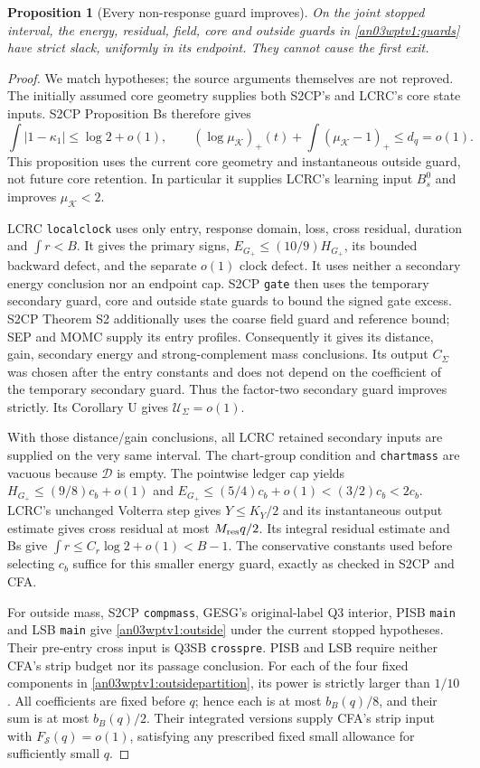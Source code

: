 \documentclass[11pt]{article}
\newtheorem{proposition}[theorem]{Proposition}
\theoremstyle{remark}\newtheorem{remark}[theorem]{Remark}
\newcommand{\KK}{\mathcal K}
\newcommand{\Gp}{G_+}
\begin{document}
\begin{proposition}[Every non-response guard improves]
\label{an03wptv1:improvements}
On the joint stopped interval, the energy, residual, field, core
and outside guards in \eqref{an03wptv1:guards} have strict slack,
uniformly in its endpoint. They cannot cause the first exit.
\end{proposition}
\begin{proof}
We match hypotheses; the source arguments themselves are not
reproved. The initially assumed core geometry supplies both
S2CP's and LCRC's core state inputs. S2CP Proposition Bs therefore
gives
\[
 \int|1-\kappa_1|\le\log2+o(1),\qquad
 (\log\mu_{\KK})_+(t)+\int(\mu_{\KK}-1)_+\le d_q=o(1).
\]
This proposition uses the current core geometry and instantaneous
outside guard, not future core retention. In particular it supplies
LCRC's learning input $B_s^0$ and improves $\mu_{\KK}<2$.

LCRC \texttt{localclock} uses only entry, response domain, loss,
cross residual, duration and $\int r<B$. It gives the primary
signs, $E_{\Gp}\le(10/9)H_{\Gp}$, its bounded backward defect,
and the separate $o(1)$ clock defect. It uses neither a secondary
energy conclusion nor an endpoint cap. S2CP \texttt{gate} then
uses the temporary secondary guard, core and outside state guards
to bound the signed gate excess. S2CP Theorem S2 additionally
uses the coarse field guard and reference bound; SEP and MOMC
supply its entry profiles. Consequently it gives its distance,
gain, secondary energy and strong-complement mass conclusions.
Its output $C_\Sigma$ was chosen after the entry constants and
does not depend on the coefficient of the temporary secondary
guard. Thus the factor-two secondary guard improves strictly.
Its Corollary U gives $\mathcal U_\Sigma=o(1)$.

With those distance/gain conclusions, all LCRC retained secondary
inputs are supplied on the very same interval. The chart-group
condition and \texttt{chartmass} are vacuous because $\mathcal D$
is empty. The pointwise ledger cap yields
$H_{\Gp}\le(9/8)c_b+o(1)$ and
$E_{\Gp}\le(5/4)c_b+o(1)<(3/2)c_b<2c_b$.
LCRC's unchanged Volterra step gives $Y\le K_Y/2$ and its
instantaneous output estimate gives cross residual at most
$M_{\rm res}q/2$. Its integral residual estimate and Bs give
$\int r\le C_r\log2+o(1)<B-1$.
The conservative constants used before selecting $c_b$ suffice
for this smaller energy guard, exactly as checked in S2CP and CFA.

For outside mass, S2CP \texttt{compmass}, GESG's original-label
Q3 interior, PISB \texttt{main} and LSB \texttt{main} give
\eqref{an03wptv1:outside} under the current stopped hypotheses.
Their pre-entry cross input is Q3SB \texttt{crosspre}.
PISB and LSB require neither CFA's strip budget nor its passage
conclusion. For each of the four fixed components in
\eqref{an03wptv1:outsidepartition}, its power is strictly larger
than $1/10$. All coefficients are fixed before $q$; hence each
is at most $b_B(q)/8$, and their sum is at most $b_B(q)/2$.
Their integrated versions supply CFA's strip input with
$F_{\mathcal S}(q)=o(1)$, satisfying any prescribed fixed small
allowance for sufficiently small $q$.


\end{proof}
\end{document}

